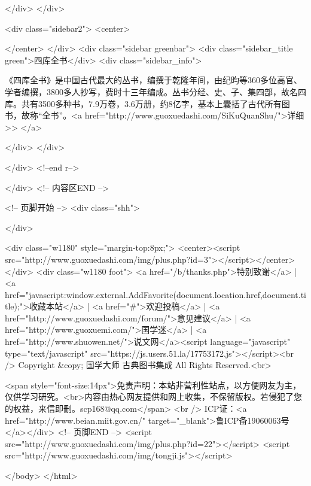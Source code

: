 </div>
</div>


<div class="sidebar2">
<center>

</center>
</div>
<div class="sidebar greenbar">
<div class="sidebar_title green">四库全书</div>
<div class="sidebar_info">

《四库全书》是中国古代最大的丛书，编撰于乾隆年间，由纪昀等360多位高官、学者编撰，3800多人抄写，费时十三年编成。丛书分经、史、子、集四部，故名四库。共有3500多种书，7.9万卷，3.6万册，约8亿字，基本上囊括了古代所有图书，故称“全书”。<a href="http://www.guoxuedashi.com/SiKuQuanShu/">详细>>
</a>

</div> 
</div>

</div>  <!--end r-->

</div>
<!-- 内容区END --> 

<!-- 页脚开始 -->
<div class="shh">

</div>

<div class="w1180" style="margin-top:8px;">
<center><script src="http://www.guoxuedashi.com/img/plus.php?id=3"></script></center>
</div>
<div class="w1180 foot">
<a href="/b/thanks.php">特别致谢</a> | <a href="javascript:window.external.AddFavorite(document.location.href,document.title);">收藏本站</a> | <a href="#">欢迎投稿</a> | <a href="http://www.guoxuedashi.com/forum/">意见建议</a> | <a href="http://www.guoxuemi.com/">国学迷</a> | <a href="http://www.shuowen.net/">说文网</a><script language="javascript" type="text/javascript" src="https://js.users.51.la/17753172.js"></script><br />
  Copyright &copy; 国学大师 古典图书集成 All Rights Reserved.<br>
  
  <span style="font-size:14px">免责声明：本站非营利性站点，以方便网友为主，仅供学习研究。<br>内容由热心网友提供和网上收集，不保留版权。若侵犯了您的权益，来信即刪。scp168@qq.com</span>
  <br />
ICP证：<a href="http://www.beian.miit.gov.cn/" target="_blank">鲁ICP备19060063号</a></div>
<!-- 页脚END --> 
<script src="http://www.guoxuedashi.com/img/plus.php?id=22"></script>
<script src="http://www.guoxuedashi.com/img/tongji.js"></script>

</body>
</html>
